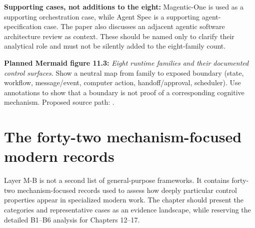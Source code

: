 \textbf{Supporting cases, not additions to the eight:} Magentic-One is used as a supporting orchestration case, while Agent Spec is a supporting agent-specification case. The paper also discusses an adjacent agentic software architecture review as context. These should be named only to clarify their analytical role and must not be silently added to the eight-family count.

\textbf{Planned Mermaid figure 11.3:} \emph{Eight runtime families and their documented control surfaces}. Show a neutral map from family to exposed boundary (state, workflow, message/event, computer action, handoff/approval, scheduler). Use annotations to show that a boundary is not proof of a corresponding cognitive mechanism. Proposed source path: .

\section{The forty-two mechanism-focused modern records}
Layer M-B is not a second list of general-purpose frameworks. It contains forty-two mechanism-focused records used to assess how deeply particular control properties appear in specialized modern work. The chapter should present the categories and representative cases as an evidence landscape, while reserving the detailed B1--B6 analysis for Chapters 12--17.

